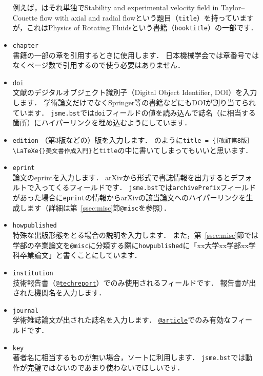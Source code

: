 \documentclass[a4paper,fleqn,uplatex,dvipdfmx]{jsarticle}
\makeatletter
\newcommand{\jsmefile}{\texttt{jsme.bst}}
\newcommand{\ttarticle}{\texttt{@article}}
\newcommand{\ttmisc}{\texttt{@misc}}
\newcommand{\tttechreport}{\texttt{@techreport}}
\makeatother
\begin{document}
\begin{itemize}
        例えば，\citet{Lueptow:Springer2000}はそれ単独でStability and experimental velocity field in Taylor--Couette flow with axial and radial flowという題目（\verb|title|）を持っていますが，これはPhysics of Rotating Fluidsという書籍（\verb|booktitle|）の一部です．
    \item \verb|chapter| \\
        書籍の一部の章を引用するときに使用します．
        日本機械学会では章番号ではなくページ数で引用するので使う必要はありません．
    \item \verb|doi| \\
        文献のデジタルオブジェクト識別子（Digital Object Identifier, DOI）を入力します．
        学術論文だけでなくSpringer等の書籍などにもDOIが割り当てられています．
        \jsmefile では\verb|doi|フィールドの値を読み込んで誌名（に相当する箇所）にハイパーリンクを埋め込むようにしています．
    \item \verb|edition|
        （第3版などの）版を入力します．
        \citet{奥村:技評2020}のように\verb|title = {［改訂第8版］\LaTeXe{}美文書作成入門}|と\verb|title|の中に書いてしまってもいいと思います．
    \item \verb|eprint| \\
        論文のeprintを入力します．
        arXivから\BibTeX{}形式で書誌情報を出力するとデフォルトで入ってくるフィールドです．
        \jsmefile では\verb|archivePrefix|フィールドがあった場合に\verb|eprint|の情報からarXivの該当論文へのハイパーリンクを生成します（詳細は第~\ref{ssec:misc}節\ttmisc を参照）．
    \item \verb|howpublished| \\
        特殊な出版形態をとる場合の説明を入力します．
        また，第~\ref{ssec:misc}節では学部の卒業論文を\ttmisc に分類する際に\verb|howpublished|に「xx大学xx学部xx学科卒業論文」と書くことにしています．
    \item \verb|institution| \\
        技術報告書（\hyperref[ssec:techreport]{\tttechreport}）でのみ使用されるフィールドです．
        報告書が出された機関名を入力します．
    \item \verb|journal| \\
        学術雑誌論文が出された誌名を入力します．
        \hyperref[ssec:article]{\ttarticle}でのみ有効なフィールドです．
    \item \verb|key| \\
        著者名に相当するものが無い場合，ソートに利用します．
        \jsmefile では動作が完璧ではないのであまり使わないでほしいです．

\end{itemize}
\end{document}
